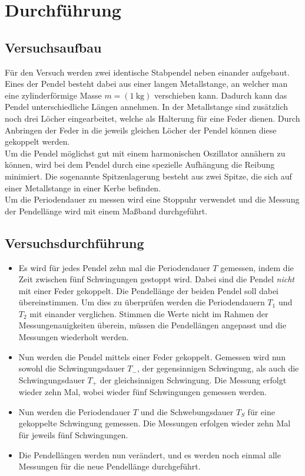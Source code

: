 \section{Durchführung}
\label{sec:Durchführung}
\subsection{Versuchsaufbau}
Für den Versuch werden zwei identische Stabpendel neben einander aufgebaut. Eines der Pendel besteht dabei aus einer langen Metallstange, an welcher man eine 
zylinderförmige Masse $m=(\SI{1}{\kilo\gram})$ verschieben kann. Dadurch kann das Pendel unterschiedliche Längen annehmen. In der Metallstange sind zusätzlich 
noch drei Löcher eingearbeitet, welche als Halterung für eine Feder dienen. Durch Anbringen der Feder in die jeweils gleichen Löcher der Pendel können diese 
gekoppelt werden.
\\
Um die Pendel möglichst gut mit einem harmonischen Oszillator annähern zu können, wird bei dem Pendel durch eine spezielle Aufhängung die Reibung minimiert. 
Die sogenannte Spitzenlagerung besteht aus zwei Spitze, die sich auf einer Metallstange in einer Kerbe befinden. 
\\
Um die Periodendauer zu messen wird eine Stoppuhr verwendet und die Messung der Pendellänge wird mit einem Maßband durchgeführt. 
\subsection{Versuchsdurchführung}
\begin{itemize}
    \item Es wird für jedes Pendel zehn mal die Periodendauer $T$ gemessen, indem die Zeit zwischen fünf Schwingungen gestoppt wird. Dabei sind die Pendel 
        \textit{nicht} mit einer Feder gekoppelt. Die Pendellänge der beiden Pendel soll dabei übereinstimmen. Um dies zu überprüfen werden die Periodendauern 
        $T_1$ und $T_2$ mit einander verglichen. Stimmen die Werte nicht im Rahmen der Messungenauigkeiten überein, müssen die Pendellängen angepasst und die 
        Messungen wiederholt werden. 
    \item Nun werden die Pendel mittels einer Feder gekoppelt. Gemessen wird nun sowohl die Schwingungsdauer $T_-$, der gegensinnigen Schwingung, als auch die 
        Schwingungsdauer $T_+$ der gleichsinnigen Schwingung. Die Messung erfolgt wieder zehn Mal, wobei wieder fünf Schwingungen gemessen werden. 
    \item Nun werden die Periodendauer $T$ und die Schwebungsdauer $T_S$ für eine gekoppelte Schwingung gemessen. Die Messungen erfolgen wieder zehn Mal für 
        jeweils fünf Schwingungen.
    \item Die Pendellängen werden nun verändert, und es werden noch einmal alle Messungen für die neue Pendellänge durchgeführt.
\end{itemize}